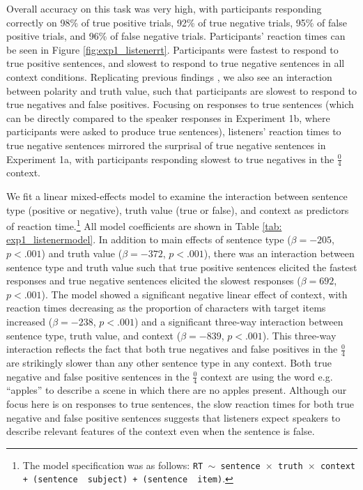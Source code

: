 \documentclass[man, floatsintext, noapacite]{apa6}
\begin{document}
Overall accuracy on this task was very high, with participants responding correctly on 98\% of true positive trials, 92\% of true negative trials, 95\% of false positive trials, and 96\% of false negative trials.  Participants' reaction times can be seen in Figure \ref{fig:exp1_listenerrt}. Participants were fastest to respond to true positive sentences, and slowest to respond to true negative sentences in all context conditions. Replicating previous findings \cite{hclark1972}, we also see an interaction between polarity and truth value, such that participants are slowest to respond to true negatives and false positives. Focusing on responses to true sentences (which can be directly compared to the speaker responses in Experiment 1b, where participants were asked to produce true sentences), listeners' reaction times to true negative sentences mirrored the surprisal of true negative sentences in Experiment 1a, with participants responding slowest to true negatives in the $\frac{0}{4}$ context.

We fit a linear mixed-effects model to examine the interaction between sentence type (positive or negative), truth value (true or false), and context as predictors of reaction time.\footnote{The model specification was as follows: \texttt{RT $\sim$ sentence~$\times$~truth~$\times$~context + (sentence~\textbar~subject) +  (sentence~\textbar~item)}.} All model coefficients are shown in Table \ref{tab: exp1_listenermodel}. In addition to main effects of sentence type ($\beta= -205$, $p< .001$) and truth value ($\beta= -372$, $p< .001$), there was an interaction between sentence type and truth value such that true positive sentences elicited the fastest responses and true negative sentences elicited the slowest responses ($\beta= 692$, $p< .001$). The model showed a significant negative linear effect of context, with reaction times decreasing as the proportion of characters with target items increased ($\beta= -238$, $p< .001$) and a significant three-way interaction between sentence type, truth value, and context ($\beta= -839$, $p< .001$).  This three-way interaction reflects the fact that both true negatives and false positives in the $\frac{0}{4}$ are strikingly slower than any other sentence type in any context. Both true negative and false positive sentences in the $\frac{0}{4}$ context are using the word e.g. ``apples'' to describe a scene in which there are no apples present. Although our focus here is on responses to true sentences, the slow reaction times for both true negative and false positive sentences suggests that listeners expect speakers to describe relevant features of the context even when the sentence is false. 
\end{document}
